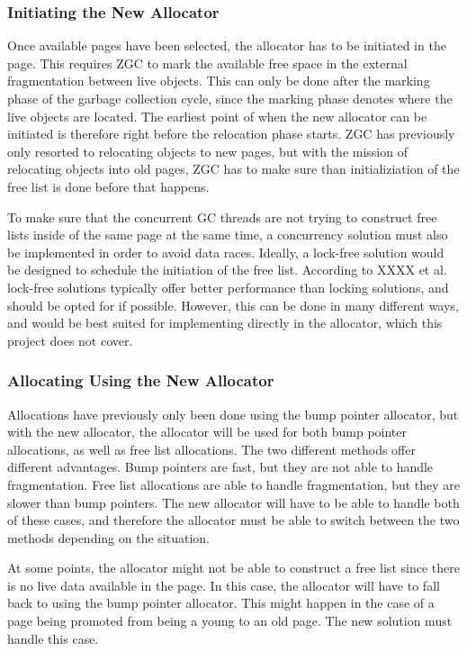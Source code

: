 \subsubsection{Initiating the New Allocator}
Once available pages have been selected, the allocator has to be initiated in the page. This requires ZGC to mark the available free space in the external fragmentation between live objects. This can only be done after the marking phase of the garbage collection cycle, since the marking phase denotes where the live objects are located. The earliest point of when the new allocator can be initiated is therefore right before the relocation phase starts. ZGC has previously only resorted to relocating objects to new pages, but with the mission of relocating objects into old pages, ZGC has to make sure than initializiation of the free list is done before that happens. 

To make sure that the concurrent GC threads are not trying to construct free lists inside of the same page at the same time, a concurrency solution must also be implemented in order to avoid data races. Ideally, a lock-free solution would be designed to schedule the initiation of the free list. According to XXXX et al. lock-free solutions typically offer better performance than locking solutions, and should be opted for if possible. However, this can be done in many different ways, and would be best suited for implementing directly in the allocator, which this project does not cover.

\subsubsection{Allocating Using the New Allocator}
Allocations have previously only been done using the bump pointer allocator, but with the new allocator, the allocator will be used for both bump pointer allocations, as well as free list allocations. The two different methods offer different advantages. Bump pointers are fast, but they are not able to handle fragmentation. Free list allocations are able to handle fragmentation, but they are slower than bump pointers. The new allocator will have to be able to handle both of these cases, and therefore the allocator must be able to switch between the two methods depending on the situation. 

At some points, the allocator might not be able to construct a free list since there is no live data available in the page. In this case, the allocator will have to fall back to using the bump pointer allocator. This might happen in the case of a page being promoted from being a young to an old page. The new solution must handle this case.

